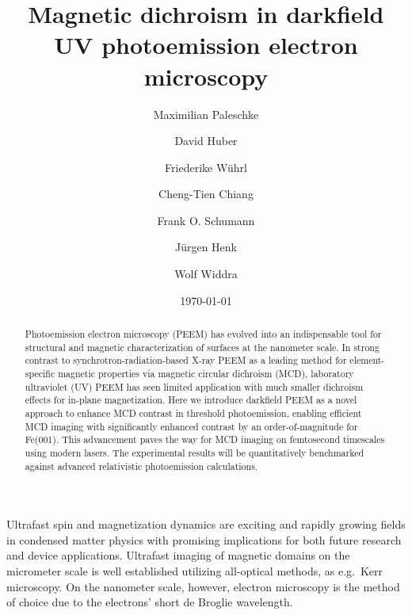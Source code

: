 \documentclass[prl,twocolumn,floatfix,superscriptaddress,aps]{revtex4-2}
\begin{document}
\title{Magnetic dichroism in darkfield UV photoemission electron microscopy}
\author{Maximilian Paleschke}
\author{David Huber}
\author{Friederike Wührl}

\author{Cheng-Tien Chiang}

\author{Frank O. Schumann}

\author{Jürgen Henk}
\author{Wolf Widdra}


\date{\today}

\begin{abstract}
    Photoemission electron microscopy (PEEM) has evolved into an indispensable tool for structural and magnetic characterization of surfaces at the nanometer scale. In strong contrast to synchrotron-radiation-based X-ray PEEM as a leading method for element-specific magnetic properties via magnetic circular dichroism (MCD), laboratory ultraviolet (UV) PEEM has seen limited application with much smaller dichroism effects for in-plane magnetization. Here we introduce darkfield PEEM as a novel approach to enhance MCD contrast in threshold photoemission, enabling efficient MCD imaging with significantly enhanced contrast by an order-of-magnitude for Fe(001). This advancement paves the way for
    MCD imaging on femtosecond timescales using modern lasers. The experimental results will be quantitatively benchmarked against advanced relativistic photoemission calculations.
\end{abstract}

\pacs{}

\maketitle
Ultrafast spin and magnetization dynamics are exciting and rapidly growing fields in condensed matter physics with promising implications for both future research and device applications. Ultrafast imaging of magnetic domains on the micrometer scale is well established utilizing all-optical methods, as e.g.\ Kerr microscopy. On the nanometer scale, however, electron microscopy is the method of choice due to the electrons' short de Broglie wavelength. 
\end{document}
